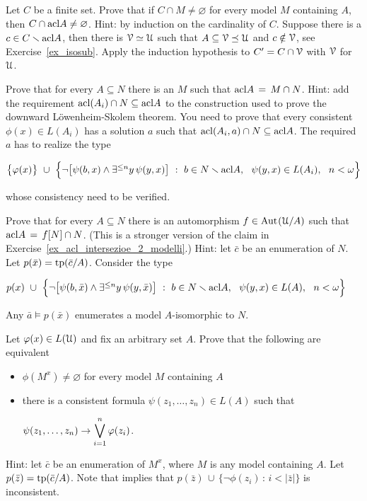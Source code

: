 \begin{exercise}\label{pofu2}
Let $C$ be a finite set.
Prove that if $C\cap M\neq\varnothing$ for every model $M$ containing $A$, then $C\cap{\rm acl} A\neq\varnothing$.
Hint: by induction on the cardinality of $C$.
Suppose there is a $c\in C\smallsetminus{\rm acl} A$, then there is $\EuScript V\simeq\EuScript U$ such that 
$A\subseteq\EuScript V\preceq\EuScript U$ and $c\notin\EuScript V$, see Exercise~\ref{ex_isosub}.
Apply the induction hypothesis to $C'=C\cap\EuScript V$ with $\EuScript V$ for $\EuScript U$.
\end{exercise}

\begin{exercise}\label{ex_acl_intersezioe_2_modelli}
Prove that for every $A\subseteq N$ there is an $M$ such that ${\rm acl} A\,=\,M\cap N$.
Hint: add the requirement ${\rm acl}(A_i)\cap N\subseteq{\rm acl} A$ to the construction 
used to prove the downward L\"owenheim-Skolem theorem.
You need to prove that every consistent $\phi(x)\in L(A_i)$ has a solution $a$ such that 
${\rm acl}(A_i,a)\cap N\subseteq{\rm acl} A$.
The required $a$ has to realize the type

\hfil$\big\{\phi(x)\big\}\ \cup\ \Big\{\neg\big[\psi(b,x)\wedge\E^{\le n}y\,\psi(y,x)\big]
\ :\ 
b\in N\sm\acl A,\ \ \psi(y,x)\in L(A_i),\ \ n<\omega\Big\}$

whose consistency need to be verified.
\end{exercise}

\begin{exercise}\label{ex_acl_intersezione_2_modelli_iso}
Prove that for every $A\subseteq N$ there is an automorphism $f\in{\rm Aut\kern.15ex}(\EuScript U/A)$ such that 
${\rm acl} A\,=\,f[N]\cap N$. 
(This is a stronger version of the claim in Exercise~\ref{ex_acl_intersezioe_2_modelli}.) 
Hint: let $\bar c$ be an enumeration of $N$.
Let $p(\bar x)={\rm tp}(\bar c/A)$. 
Consider the type

\hfil$p(x)\ \cup\ \Big\{\neg\big[\psi(b,\bar x)\wedge\E^{\le n}y\,\psi(y,\bar x)\big]
\ :\ 
b\in N\sm\acl A,\ \ \psi(y,x)\in L(A),\ \ n<\omega\Big\}$

Any $\bar a\models p(\bar x)$ enumerates a model $A$-isomorphic to $N$.
\end{exercise}

\begin{exercise}\label{ex_almost_satisfied}
Let $\varphi(x)\in L(\EuScript U)$ and fix an arbitrary set $A$.
Prove that the following are equivalent
\begin{itemize}
\item[1.] $\phi(M^x)\neq\varnothing$ for every model $M$ containing $A$
\item[2.] there is a consistent formula $\psi(z_1,\dots,z_n)\in L(A)$ such that

\hfil$\displaystyle\psi(z_1,\dots,z_n)\rightarrow\bigvee^n_{i=1}\varphi(z_i)$.
\end{itemize}
Hint: let $\bar c$ be an enumeration of $M^x$, where $M$ is any model containing $A$.
Let $p(\bar z)={\rm tp}(\bar c/A)$.
Note that \ssf{1} implies that $p(\bar z)\,\cup\, \big\{\neg\phi(z_i)\, :\, i<|\bar z|\big\}$ is inconsistent.
\end{exercise}

